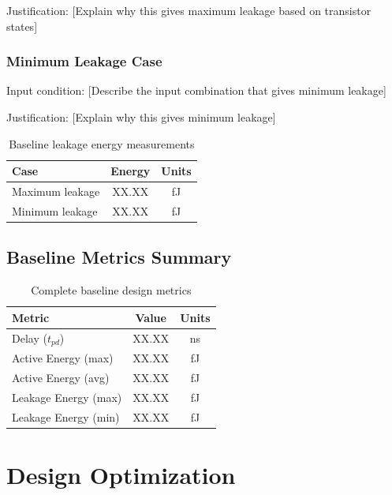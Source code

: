 \documentclass[12pt,letterpaper]{article}
\begin{document}
Justification: [Explain why this gives maximum leakage based on transistor states]

\subsubsection{Minimum Leakage Case}

Input condition: [Describe the input combination that gives minimum leakage]

Justification: [Explain why this gives minimum leakage]

\begin{table}[H]
\centering
\caption{Baseline leakage energy measurements}
\label{tab:baseline_leakage}
\begin{tabular}{@{}lcc@{}}
\toprule
\textbf{Case} & \textbf{Energy} & \textbf{Units} \\
\midrule
Maximum leakage & XX.XX & fJ \\
Minimum leakage & XX.XX & fJ \\
\bottomrule
\end{tabular}
\end{table}

\subsection{Baseline Metrics Summary}

\begin{table}[H]
\centering
\caption{Complete baseline design metrics}
\label{tab:baseline_summary}
\begin{tabular}{@{}lcc@{}}
\toprule
\textbf{Metric} & \textbf{Value} & \textbf{Units} \\
\midrule
Delay ($t_{pd}$) & XX.XX & ns \\
Active Energy (max) & XX.XX & fJ \\
Active Energy (avg) & XX.XX & fJ \\
Leakage Energy (max) & XX.XX & fJ \\
Leakage Energy (min) & XX.XX & fJ \\
\bottomrule
\end{tabular}
\end{table}

\section{Design Optimization}
\label{sec:optimization}

\end{document}
